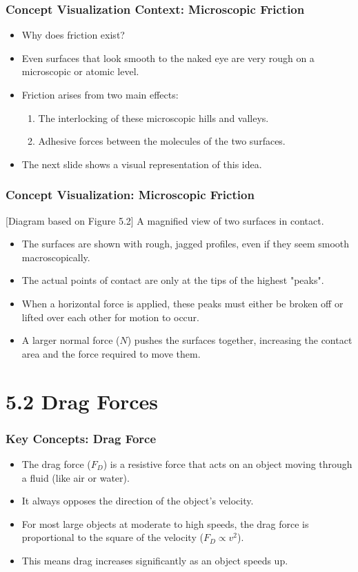 \documentclass{beamer}
\begin{document}
\begin{frame}
\frametitle{Concept Visualization Context: Microscopic Friction}
\begin{itemize}
    \item Why does friction exist? \pause
    \item Even surfaces that look smooth to the naked eye are very rough on a microscopic or atomic level. \pause
    \item Friction arises from two main effects:
    \begin{enumerate}
        \item The interlocking of these microscopic hills and valleys. \pause
        \item Adhesive forces between the molecules of the two surfaces.
    \end{enumerate} \pause
    \item The next slide shows a visual representation of this idea.
\end{itemize}
\end{frame}

\begin{frame}
\frametitle{Concept Visualization: Microscopic Friction}
\begin{alertblock}{[Diagram based on Figure 5.2]}
A magnified view of two surfaces in contact.
\begin{itemize}
    \item The surfaces are shown with rough, jagged profiles, even if they seem smooth macroscopically.
    \item The actual points of contact are only at the tips of the highest "peaks".
    \item When a horizontal force is applied, these peaks must either be broken off or lifted over each other for motion to occur.
    \item A larger normal force ($N$) pushes the surfaces together, increasing the contact area and the force required to move them.
\end{itemize}
\end{alertblock}
\end{frame}

\section{5.2 Drag Forces}

\begin{frame}
\frametitle{Key Concepts: Drag Force}
\begin{itemize}
    \item The drag force ($F_D$) is a resistive force that acts on an object moving through a fluid (like air or water). \pause
    \item It always opposes the direction of the object's velocity. \pause
    \item For most large objects at moderate to high speeds, the drag force is proportional to the square of the velocity ($F_D \propto v^2$). \pause
    \item This means drag increases significantly as an object speeds up.
\end{itemize}
\end{frame}
\end{document}
